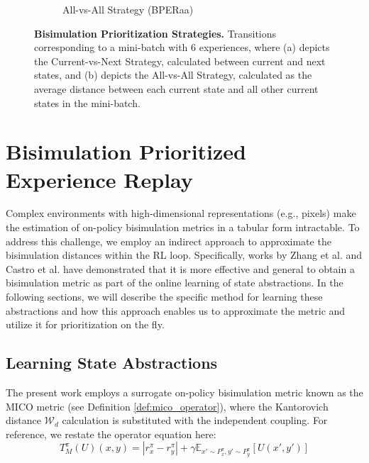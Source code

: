 \begin{figure}[H]
\begin{subfigure}{0.45\textwidth}
        \caption{All-vs-All Strategy (BPERaa)}
        \label{fig:all_vs_all}
    \end{subfigure}
    \caption[Bisimulation Prioritization Strategies]{\textbf{Bisimulation Prioritization Strategies.} Transitions corresponding to a mini-batch with 6 experiences, where (a) depicts the Current-vs-Next Strategy, calculated between current and next states, and (b) depicts the All-vs-All Strategy, calculated as the average distance between each current state and all other current states in the mini-batch.}
    \label{fig:bper_strategies}
\end{figure}

\section{Bisimulation Prioritized Experience Replay}
\label{sec:bper_method}


Complex environments with high-dimensional representations (e.g., pixels) make the estimation of on-policy bisimulation metrics in a tabular form intractable. To address this challenge, we employ an indirect approach to approximate the bisimulation distances within the RL loop. Specifically, works by Zhang et al. \cite{zhang2020learning} and Castro et al. \cite{castro2021mico} have demonstrated that it is more effective and general to obtain a bisimulation metric as part of the online learning of state abstractions. In the following sections, we will describe the specific method for learning these abstractions and how this approach enables us to approximate the metric and utilize it for prioritization on the fly.

\subsection{Learning State Abstractions}

The present work employs a surrogate on-policy bisimulation metric known as the MICO metric \cite{castro2021mico} (see Definition \ref{def:mico_operator}), where the Kantorovich distance $\mathcal{W}_d$ calculation is substituted with the independent coupling. For reference, we restate the operator equation here:
$$
\label{eq:mico_operator}
    T^\pi_M(U)(x, y) = |r^\pi_{x} - r^\pi_{y}| + \gamma \mathbb{E}_{x'\sim P_x^\pi, y'\sim P_y^\pi}\left[U(x',y') \right]
$$

